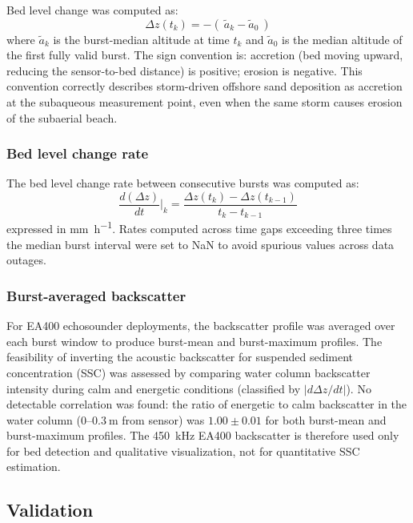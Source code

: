 Bed level change was computed as:
%
\begin{equation}
  \Delta z(t_k) = -(\ \tilde{a}_k - \tilde{a}_0\ )
\end{equation}
%
where $\tilde{a}_k$ is the burst-median altitude at time $t_k$ and
$\tilde{a}_0$ is the median altitude of the first fully valid burst.
The sign convention is: accretion (bed moving upward, reducing the
sensor-to-bed distance) is positive; erosion is negative. This
convention correctly describes storm-driven offshore sand deposition
as accretion at the subaqueous measurement point, even when the same
storm causes erosion of the subaerial beach.

\subsubsection{Bed level change rate}

The bed level change rate between consecutive bursts was computed as:
%
\begin{equation}
  \frac{d(\Delta z)}{dt}\bigg|_{k} =
  \frac{\Delta z(t_k) - \Delta z(t_{k-1})}{t_k - t_{k-1}}
\end{equation}
%
expressed in \si{\milli\meter\per\hour}. Rates computed across time
gaps exceeding three times the median burst interval were set to NaN
to avoid spurious values across data outages.

\subsubsection{Burst-averaged backscatter}

For EA400 echosounder deployments, the backscatter profile was
averaged over each burst window to produce burst-mean and burst-maximum
profiles. The feasibility of inverting the acoustic backscatter for
suspended sediment concentration (SSC) was assessed by comparing
water column backscatter intensity during calm and energetic conditions
(classified by $|d\Delta z/dt|$). No detectable correlation was found:
the ratio of energetic to calm backscatter in the water column
($0$--$\SI{0.3}{\meter}$ from sensor) was $1.00 \pm 0.01$ for both
burst-mean and burst-maximum profiles. The \SI{450}{\kilo\hertz}
EA400 backscatter is therefore used only for bed detection and
qualitative visualization, not for quantitative SSC estimation.

\subsection{Validation}

